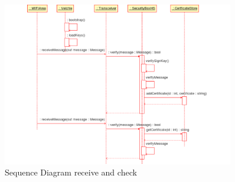 \begin{figure}[ht]
\centerline{\includegraphics[width=0.9\textwidth]{hybrid_scheme_receive_message.pdf}}
\caption{Sequence Diagram \hybrid receive and check}
\label{fig:sequence_receive_hybridscheme}
\end{figure}